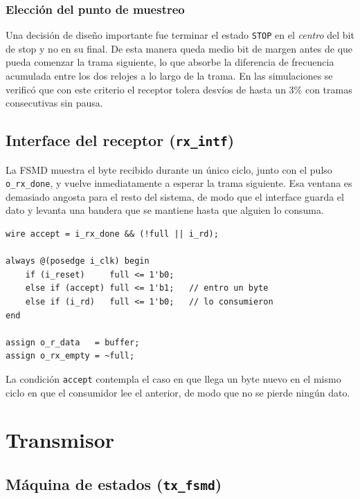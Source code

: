 \documentclass[12pt,a4paper]{article}
\begin{document}
\subsubsection{Elección del punto de muestreo}

Una decisión de diseño importante fue terminar el estado \texttt{STOP} en el
\emph{centro} del bit de stop y no en su final. De esta manera queda medio bit
de margen antes de que pueda comenzar la trama siguiente, lo que absorbe la
diferencia de frecuencia acumulada entre los dos relojes a lo largo de la trama.
En las simulaciones se verificó que con este criterio el receptor tolera
desvíos de hasta un 3\% con tramas consecutivas sin pausa.

\subsection{Interface del receptor (\texttt{rx\_intf})}

La FSMD muestra el byte recibido durante un único ciclo, junto con el pulso
\texttt{o\_rx\_done}, y vuelve inmediatamente a esperar la trama siguiente. Esa
ventana es demasiado angosta para el resto del sistema, de modo que el interface
guarda el dato y levanta una bandera que se mantiene hasta que alguien lo
consuma.

\begin{lstlisting}[caption={Lógica del buffer de recepción.}]
wire accept = i_rx_done && (!full || i_rd);

always @(posedge i_clk) begin
    if (i_reset)     full <= 1'b0;
    else if (accept) full <= 1'b1;   // entro un byte
    else if (i_rd)   full <= 1'b0;   // lo consumieron
end

assign o_r_data   = buffer;
assign o_rx_empty = ~full;
\end{lstlisting}

La condición \texttt{accept} contempla el caso en que llega un byte nuevo en el
mismo ciclo en que el consumidor lee el anterior, de modo que no se pierde
ningún dato.

\section{Transmisor}

\subsection{Máquina de estados (\texttt{tx\_fsmd})}
\end{document}
